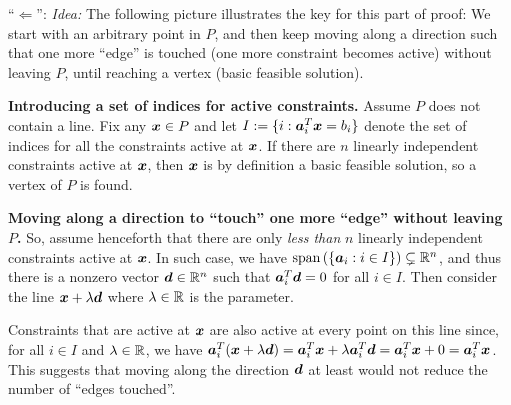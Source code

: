 \begin{enumerate}
\begin{pf}
``\(\Leftarrow\)'': \emph{Idea:} The following picture illustrates the key
 for this part of proof: We start with an arbitrary point in
\(P\), and then keep moving along a direction such that one more ``edge'' is
touched (one more constraint becomes active) without leaving \(P\), until
reaching a vertex (basic feasible solution).
\begin{center}
\end{center}
\textbf{Introducing a set of indices for active constraints.}
Assume \(P\) does not contain a line. Fix any \(\bm{x}\in P\) and let
\(I:=\{i:\bm{a}_{i}^{T}\bm{x}=b_i\}\) denote the set of indices for all the
constraints active at \(\bm{x}\). If there are \(n\) linearly independent
constraints active at \(\bm{x}\), then \(\bm{x}\) is by definition a basic
feasible solution, so a vertex of \(P\) is found.

\textbf{Moving along a direction to ``touch'' one more ``edge'' without leaving \(P\).}
So, assume henceforth that there are only \emph{less than} \(n\) linearly
independent constraints active at \(\bm{x}\). In such case, we have
\(\operatorname{span}\left(\{\bm{a}_i:i\in I\}\right)\subsetneq \mathbb{R}^n\), and thus there is a nonzero
vector \(\bm{d}\in \mathbb{R}^n\) such that \(\bm{a}_i^{T}\bm{d}=0\) for all
\(i\in I\). Then consider the line \(\bm{x}+\lambda\bm{d}\) where
\(\lambda\in\mathbb{R}\) is the parameter.

Constraints that are active at \(\bm{x}\) are also active at every point on
this line since, for all \(i\in I\) and \(\lambda\in\mathbb{R}\), we have
\(\bm{a}_i^{T}(\bm{x}+\lambda\bm{d})
=\bm{a}_i^{T}\bm{x}+\lambda\bm{a}_i^{T}\bm{d}=\bm{a}_i^{T}\bm{x}+0=\bm{a}_i^{T}\bm{x}\).
This suggests that moving along the direction \(\bm{d}\) at least would not
reduce the number of ``edges touched''.


\end{pf}
\end{enumerate}
